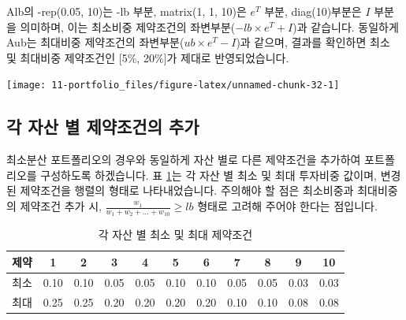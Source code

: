 \documentclass[12pt,]{book}
\newenvironment{Shaded}{\begin{snugshade}}{\end{snugshade}}
\newcommand{\DataTypeTok}[1]{\textcolor[rgb]{0.13,0.29,0.53}{#1}}
\newcommand{\FloatTok}[1]{\textcolor[rgb]{0.00,0.00,0.81}{#1}}
\newcommand{\KeywordTok}[1]{\textcolor[rgb]{0.13,0.29,0.53}{\textbf{#1}}}
\newcommand{\NormalTok}[1]{#1}
\newcommand{\OperatorTok}[1]{\textcolor[rgb]{0.81,0.36,0.00}{\textbf{#1}}}
\newcommand{\OtherTok}[1]{\textcolor[rgb]{0.56,0.35,0.01}{#1}}
\newcommand{\StringTok}[1]{\textcolor[rgb]{0.31,0.60,0.02}{#1}}
\begin{document}
Alb의 -rep(0.05, 10)는 -lb 부분, matrix(1, 1, 10)은 \(e^T\) 부분, diag(10)부분은 \(I\) 부분을 의미하며, 이는 최소비중 제약조건의 좌변부분(\(-lb \times e^T + I\))과 같습니다. 동일하게 Aub는 최대비중 제약조건의 좌변부분(\(ub \times e^T - I\))과 같으며, 결과를 확인하면 최소 및 최대비중 제약조건인 {[}5\%, 20\%{]}가 제대로 반영되었습니다.

\begin{Shaded}
\end{Shaded}

\begin{center}\texttt{[image: 11-portfolio\_files/figure-latex/unnamed-chunk-32-1]} \end{center}

\hypertarget{section-75}{%
\subsection{각 자산 별 제약조건의 추가}\label{section-75}}

최소분산 포트폴리오의 경우와 동일하게 자산 별로 다른 제약조건을 추가하여 포트폴리오를 구성하도록 하겠습니다. 표 \ref{tab:mdpconst2}는 각 자산 별 최소 및 최대 투자비중 값이며, 변경된 제약조건을
행렬의 형태로 나타내었습니다. 주의해야 할 점은 최소비중과 최대비중의 제약조건 추가 시, \(\frac{w_1}{w_1+w_2+\dots+w_{10}} \ge lb\) 형태로 고려해 주어야 한다는 점입니다.

\begin{table}[!h]

\caption{\label{tab:mdpconst2}각 자산 별 최소 및 최대 제약조건}
\centering
\begin{tabular}{ccccccccccc}
\toprule
제약 & 1 & 2 & 3 & 4 & 5 & 6 & 7 & 8 & 9 & 10\\
\midrule
\rowcolor{gray!6}  최소 & 0.10 & 0.10 & 0.05 & 0.05 & 0.10 & 0.10 & 0.05 & 0.05 & 0.03 & 0.03\\
최대 & 0.25 & 0.25 & 0.20 & 0.20 & 0.20 & 0.20 & 0.10 & 0.10 & 0.08 & 0.08\\
\bottomrule
\end{tabular}
\end{table}
\end{document}
